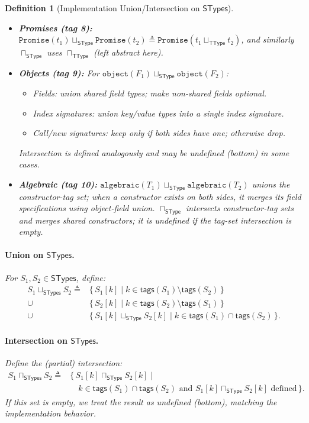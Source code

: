\documentclass[11pt]{article}
\newtheorem{definition}[theorem]{Definition}
\newcommand{\SType}{\mathsf{SType}}
\newcommand{\TType}{\mathsf{TType}}
\newcommand{\STypes}{\mathsf{STypes}}
\newcommand{\tags}{\mathsf{tags}}
\begin{document}
\begin{definition}[Implementation Union/Intersection on $\STypes$]
\begin{itemize}
\item \textbf{Promises (tag 8):}
  \(\texttt{Promise}(t_1) \sqcup_{\SType} \texttt{Promise}(t_2) \triangleq \texttt{Promise}(t_1 \sqcup_{\TType} t_2)\), and similarly \(\sqcap_{\SType}\) uses \(\sqcap_{\TType}\) (left abstract here).

\item \textbf{Objects (tag 9):}
  For \(\texttt{object}(F_1) \sqcup_{\SType} \texttt{object}(F_2)\):
  \begin{itemize}
  \item \emph{Fields:} union shared field types; make non-shared fields optional.
  \item \emph{Index signatures:} union key/value types into a single index signature.
  \item \emph{Call/new signatures:} keep only if both sides have one; otherwise drop.
  \end{itemize}
  Intersection is defined analogously and may be undefined (bottom) in some cases.

\item \textbf{Algebraic (tag 10):}
  \(\texttt{algebraic}(T_1) \sqcup_{\SType} \texttt{algebraic}(T_2)\) unions the constructor-tag set; when a constructor exists on both sides, it merges its field specifications using object-field union.
  \(\sqcap_{\SType}\) intersects constructor-tag sets and merges shared constructors; it is undefined if the tag-set intersection is empty.
\end{itemize}

\paragraph{Union on \(\STypes\).}
For \(S_1,S_2 \in \STypes\), define:
\begin{align*}
S_1 \sqcup_{\STypes} S_2 \triangleq{} &
  \{\, S_1[k] \mid k \in \tags(S_1)\setminus \tags(S_2)\,\} \\
  {}\cup{} & \{\, S_2[k] \mid k \in \tags(S_2)\setminus \tags(S_1)\,\} \\
  {}\cup{} & \{\, S_1[k] \sqcup_{\SType} S_2[k] \mid k \in \tags(S_1)\cap \tags(S_2)\,\}.
\end{align*}

\paragraph{Intersection on \(\STypes\).}
Define the (partial) intersection:
\begin{align*}
S_1 \sqcap_{\STypes} S_2 \triangleq{} &
  \{\, S_1[k] \sqcap_{\SType} S_2[k] \mid {} \\
  & \quad k \in \tags(S_1)\cap \tags(S_2) \text{ and } S_1[k]\sqcap_{\SType}S_2[k]\text{ defined}\,\}.
\end{align*}
If this set is empty, we treat the result as undefined (bottom), matching the implementation behavior.
\end{definition}
\end{document}
